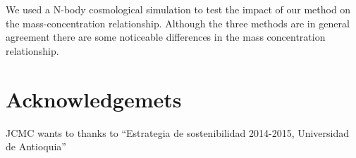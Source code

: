 \documentclass[a4,useAMS,usenatbib,usegraphicx]{mn2e}
\begin{document}
We used a N-body cosmological simulation to test the impact of our
method on the mass-concentration relationship.  Although the three
methods are in general agreement there are some noticeable differences
in the mass concentration relationship.

\section*{Acknowledgemets}
 JCMC wants to thanks to ``Estrategia de sostenibilidad 2014-2015, Universidad de Antioquia''



\end{document}
